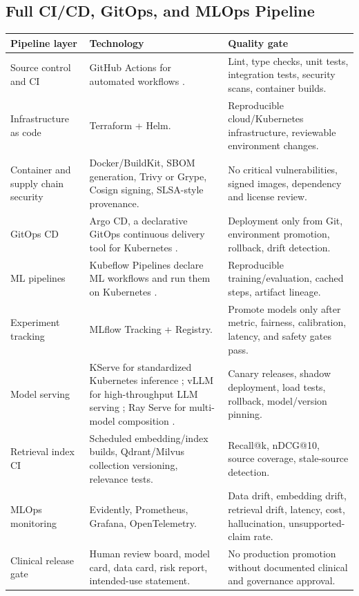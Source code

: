 \subsection{Full CI/CD, GitOps, and MLOps Pipeline}

\begin{longtable}{p{}p{}p{}}
\toprule
\textbf{Pipeline layer} & \textbf{Technology} & \textbf{Quality gate} \\
\midrule
Source control and CI & GitHub Actions for automated workflows \cite{githubActions}. & Lint, type checks, unit tests, integration tests, security scans, container builds. \\
\addlinespace
Infrastructure as code & Terraform + Helm. & Reproducible cloud/Kubernetes infrastructure, reviewable environment changes. \\
\addlinespace
Container and supply chain security & Docker/BuildKit, SBOM generation, Trivy or Grype, Cosign signing, SLSA-style provenance. & No critical vulnerabilities, signed images, dependency and license review. \\
\addlinespace
GitOps CD & Argo CD, a declarative GitOps continuous delivery tool for Kubernetes \cite{argoCD}. & Deployment only from Git, environment promotion, rollback, drift detection. \\
\addlinespace
ML pipelines & Kubeflow Pipelines declare ML workflows and run them on Kubernetes \cite{kubeflowPipelines}. & Reproducible training/evaluation, cached steps, artifact lineage. \\
\addlinespace
Experiment tracking & MLflow Tracking + Registry. & Promote models only after metric, fairness, calibration, latency, and safety gates pass. \\
\addlinespace
Model serving & KServe for standardized Kubernetes inference \cite{kserve}; vLLM for high-throughput LLM serving \cite{vllm}; Ray Serve for multi-model composition \cite{rayServe}. & Canary releases, shadow deployment, load tests, rollback, model/version pinning. \\
\addlinespace
Retrieval index CI & Scheduled embedding/index builds, Qdrant/Milvus collection versioning, relevance tests. & Recall@k, nDCG@10, source coverage, stale-source detection. \\
\addlinespace
MLOps monitoring & Evidently, Prometheus, Grafana, OpenTelemetry. & Data drift, embedding drift, retrieval drift, latency, cost, hallucination, unsupported-claim rate. \\
\addlinespace
Clinical release gate & Human review board, model card, data card, risk report, intended-use statement. & No production promotion without documented clinical and governance approval. \\
\bottomrule
\end{longtable}

